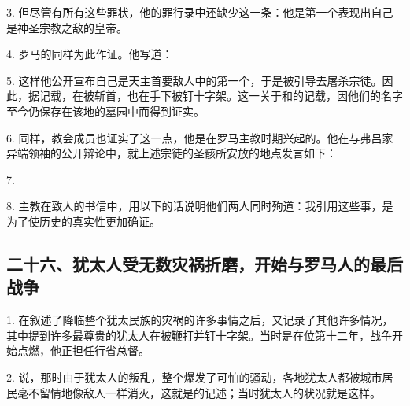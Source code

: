 3. 但尽管有所有这些罪状，他的罪行录中还缺少这一条：他是第一个表现出自己是神圣宗教之敌的皇帝。\par

4. 罗马的同样为此作证。他写道：\par

5. 这样他公开宣布自己是天主首要敌人中的第一个，于是被引导去屠杀宗徒。因此，据记载，在被斩首，也在手下被钉十字架。这一关于和的记载，因他们的名字至今仍保存在该地的墓园中而得到证实。\par

6. 同样，教会成员也证实了这一点，他是在罗马主教时期兴起的。他在与弗吕家异端领袖的公开辩论中，就上述宗徒的圣骸所安放的地点发言如下：\par

7. \par

8. 主教在致人的书信中，用以下的话说明他们两人同时殉道：我引用这些事，是为了使历史的真实性更加确证。\par


\subsection{二十六、犹太人受无数灾祸折磨，开始与罗马人的最后战争}

1. 在叙述了降临整个犹太民族的灾祸的许多事情之后，又记录了其他许多情况，其中提到许多最尊贵的犹太人在被鞭打并钉十字架。当时是在位第十二年，战争开始点燃，他正担任行省总督。\par

2. 说，那时由于犹太人的叛乱，整个爆发了可怕的骚动，各地犹太人都被城市居民毫不留情地像敌人一样消灭，这就是的记述；当时犹太人的状况就是这样。\par

